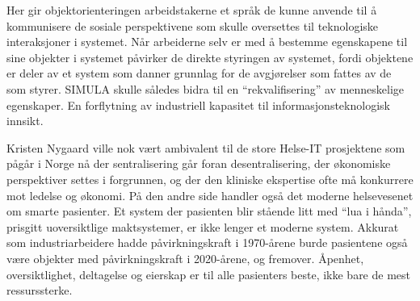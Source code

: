 \documentclass[../../main.tex]{subfiles}
\begin{document}
Her gir objektorienteringen arbeidstakerne et språk de kunne anvende til å kommunisere de sosiale perspektivene som skulle oversettes til teknologiske interaksjoner i systemet. Når arbeiderne selv er med å bestemme egenskapene til sine objekter i systemet påvirker de direkte styringen av systemet, fordi objektene er deler av et system som danner grunnlag for de avgjørelser som fattes av de som styrer. SIMULA skulle således bidra til en ``rekvalifisering'' av menneskelige egenskaper. En forflytning av industriell kapasitet til informasjonsteknologisk innsikt. 

Kristen Nygaard ville nok vært ambivalent til de store Helse-IT prosjektene som pågår i Norge nå der sentralisering går foran desentralisering, der økonomiske perspektiver settes i forgrunnen, og der den kliniske ekspertise ofte må konkurrere mot ledelse og økonomi. På den andre side handler også det moderne helsevesenet om smarte pasienter. Et system der pasienten blir stående litt med ``lua i hånda'', prisgitt uoversiktlige maktsystemer, er ikke lenger et moderne system. Akkurat som industriarbeidere hadde påvirkningskraft i 1970-årene burde pasientene også være objekter med påvirkningskraft i 2020-årene, og fremover. Åpenhet, oversiktlighet, deltagelse og eierskap er til alle pasienters beste, ikke bare de mest ressurssterke.
\end{document}
